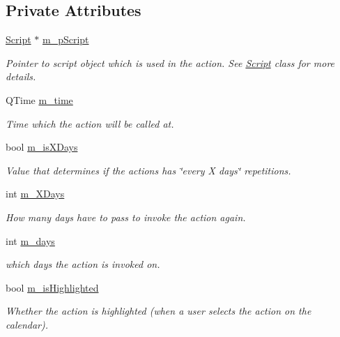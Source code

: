 \subsection*{Private Attributes}
\begin{DoxyCompactItemize}
\item 
\hyperlink{class_script}{Script} $\ast$ \hyperlink{class_action_a1a57520ab430ca6241add1e68303fb0c}{m\-\_\-p\-Script}
\begin{DoxyCompactList}\small\item\em Pointer to script object which is used in the action. See \hyperlink{class_script}{Script} class for more details. \end{DoxyCompactList}\item 
Q\-Time \hyperlink{class_action_a00911e1be6fd7fa990a2a607590edaa9}{m\-\_\-time}
\begin{DoxyCompactList}\small\item\em Time which the action will be called at. \end{DoxyCompactList}\item 
bool \hyperlink{class_action_a153c3f547daf43271aee2868cadb0762}{m\-\_\-is\-X\-Days}
\begin{DoxyCompactList}\small\item\em Value that determines if the actions has \char`\"{}every X days\char`\"{} repetitions. \end{DoxyCompactList}\item 
int \hyperlink{class_action_a9ad7c62918ef062c3f593fd3fa7fd308}{m\-\_\-\-X\-Days}
\begin{DoxyCompactList}\small\item\em How many days have to pass to invoke the action again. \end{DoxyCompactList}\item 
int \hyperlink{class_action_a646d602d39e2b6c23dc2d398530614d0}{m\-\_\-days}
\begin{DoxyCompactList}\small\item\em which days the action is invoked on. \end{DoxyCompactList}\item 
bool \hyperlink{class_action_aada07b527d172c811c85cd1d0e0de876}{m\-\_\-is\-Highlighted}
\begin{DoxyCompactList}\small\item\em Whether the action is highlighted (when a user selects the action on the calendar). \end{DoxyCompactList}\item 

\end{DoxyCompactItemize}
